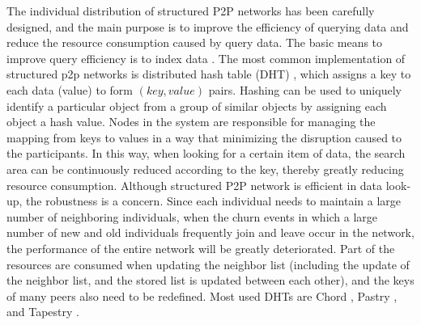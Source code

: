 The individual distribution of structured P2P networks has been carefully designed, and the main purpose is to improve the efficiency of querying data and reduce the resource consumption caused by query data. The basic means to improve query efficiency is to index data \cite{risson2006survey}. The most common implementation of structured p2p networks is distributed hash table (DHT) \cite{galuba2009distributed}, which assigns a key to each data (value) to form $(key, value)$ pairs. Hashing can be used to uniquely identify a particular object from a group of similar objects by assigning each object a hash value. Nodes in the system are responsible for managing the mapping from keys to values in a way that minimizing the disruption caused to the participants. In this way, when looking for a certain item of data, the search area can be continuously reduced according to the key, thereby greatly reducing resource consumption. Although structured P2P network is efficient in data look-up, the robustness is a concern. Since each individual needs to maintain a large number of neighboring individuals, when the churn events in which a large number of new and old individuals frequently join and leave occur in the network, the performance of the entire network will be greatly deteriorated. Part of the resources are consumed when updating the neighbor list (including the update of the neighbor list, and the stored list is updated between each other), and the keys of many peers also need to be redefined. Most used DHTs are Chord \cite{stoica2001chord}, Pastry \cite{rowstron2001pastry}, and Tapestry \cite{zhao2004tapestry}.



